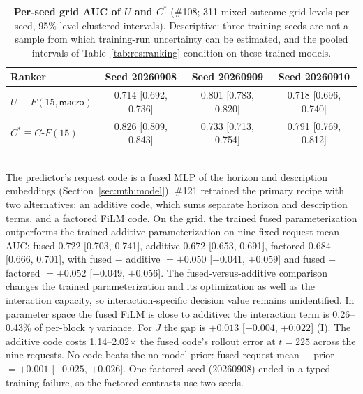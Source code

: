 \begin{table}[h]
\begin{revblock}
\centering
\footnotesize
\caption{\textbf{Per-seed grid AUC of $U$ and $C^{*}$} (\#108; 311 mixed-outcome grid levels per seed, 95\% level-clustered intervals). Descriptive: three training seeds are not a sample from which training-run uncertainty can be estimated, and the pooled intervals of Table~\ref{tab:res:ranking} condition on these trained models.}
\label{tab:app:res:perseed}
\begin{tabular}{@{}lccc@{}}
\toprule
Ranker & Seed 20260908 & Seed 20260909 & Seed 20260910 \\
\midrule
$U\equiv F(15,\textsf{macro})$ & 0.714 [0.692, 0.736] & 0.801 [0.783, 0.820] & 0.718 [0.696, 0.740] \\
$C^{*}\equiv C\text{-}F(15)$ & 0.826 [0.809, 0.843] & 0.733 [0.713, 0.754] & 0.791 [0.769, 0.812] \\
\bottomrule
\end{tabular}
\end{revblock}
\end{table}

\subsection{\texorpdfstring{}{Request-code parameterization}}
\label{sec:app:res:code}

\begin{revblock}
\nopagebreak
The predictor's request code is a fused MLP of the horizon and description embeddings (Section~\ref{sec:mth:model}). \#121 retrained the primary recipe with two alternatives: an additive code, which sums separate horizon and description terms, and a factored FiLM code. On the grid, the trained fused parameterization outperforms the trained additive parameterization on nine-fixed-request mean AUC: fused 0.722 [0.703, 0.741], additive 0.672 [0.653, 0.691], factored 0.684 [0.666, 0.701], with fused $-$ additive $=+0.050$ [$+0.041$, $+0.059$] and fused $-$ factored $=+0.052$ [$+0.049$, $+0.056$]. The fused-versus-additive comparison changes the trained parameterization and its optimization as well as the interaction capacity, so interaction-specific decision value remains unidentified. In parameter space the fused FiLM is close to additive: the interaction term is 0.26--0.43\% of per-block $\gamma$ variance. For $J$ the gap is $+0.013$ [$+0.004$, $+0.022$] (I). The additive code costs 1.14--2.02$\times$ the fused code's rollout error at $t=225$ across the nine requests. No code beats the no-model prior: fused request mean $-$ prior $=+0.001$ [$-0.025$, $+0.026$]. One factored seed (20260908) ended in a typed training failure, so the factored contrasts use two seeds.
\end{revblock}

